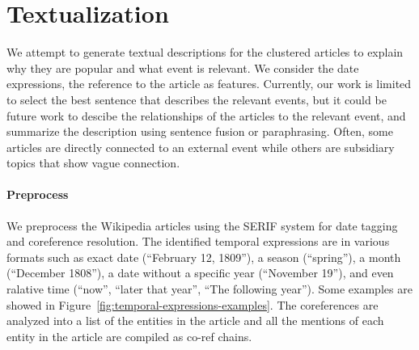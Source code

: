 \documentclass[11pt]{article}
\begin{document}
\section{Textualization}

We attempt to generate textual descriptions for the clustered articles to explain why they are popular and what event is relevant.
We consider the date expressions, the reference to the article as features. Currently, our work is limited to
select the best sentence that describes the relevant events,
but it could be future work to descibe the relationships of the articles to the relevant event,
and summarize the description using sentence fusion or paraphrasing.
Often, some articles are directly connected to an external event
while others are subsidiary topics that show vague connection.


\paragraph {Preprocess}
We preprocess the Wikipedia articles using the SERIF system \cite{BoscheeSerif} for date tagging and coreference resolution.
The identified temporal expressions are in various formats such as exact date (``February 12, 1809''), a season (``spring''), a month (``December 1808''), a date without a specific year (``November 19''), and even ralative time (``now'', ``later that year'', ``The following year''). Some examples are showed in Figure~\ref{fig:temporal-expressions-examples}.
The coreferences are analyzed into a list of the entities in the article and all the mentions of each entity in the article are compiled as co-ref chains.
\end{document}
